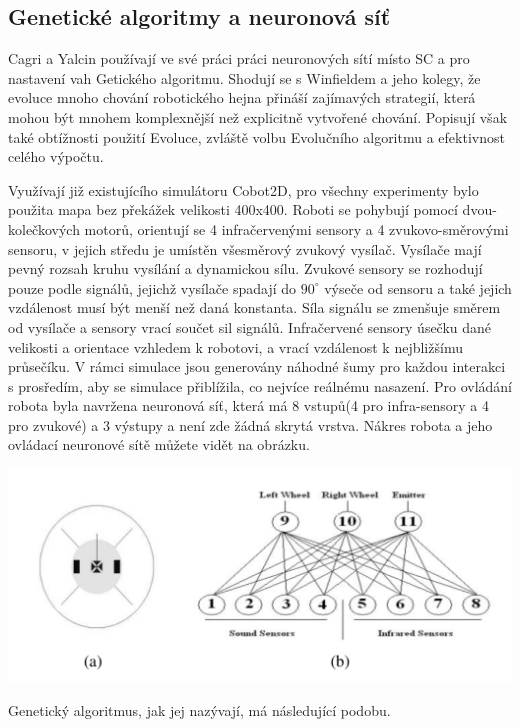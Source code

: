 \subsection{Genetické algoritmy a neuronová síť}
Cagri a Yalcin používají ve své práci \citep{yalcin2008evolving} práci neuronových sítí místo SC a pro nastavení vah Getického algoritmu. Shodují se s Winfieldem a jeho kolegy, že evoluce mnoho chování robotického hejna přináší zajímavých strategií, která mohou být mnohem komplexnější než explicitně vytvořené chování. Popisují však také obtížnosti použití Evoluce, zvláště volbu Evolučního algoritmu a efektivnost celého výpočtu. 
\par
Využívají již existujícího simulátoru Cobot2D, pro všechny experimenty bylo použita mapa bez překážek velikosti 400x400. Roboti se pohybují pomocí dvou-kolečkových motorů, orientují se 4 infračervenými sensory a 4 zvukovo-směrovými sensoru, v jejich středu je umístěn všesměrový zvukový vysílač. Vysílače mají pevný rozsah kruhu vysílání a dynamickou sílu. Zvukové sensory se rozhodují pouze podle signálů, jejichž vysílače spadají do $90^\circ$ výseče od sensoru a také jejich vzdálenost musí být menší než daná konstanta. Síla signálu se zmenšuje směrem od vysílače a sensory vrací součet sil signálů. Infračervené sensory úsečku dané velikosti a orientace vzhledem k robotovi, a vrací vzdálenost k nejbližšímu průsečíku. V rámci simulace jsou generovány náhodné šumy pro každou interakci s prosředím, aby se simulace přiblížila, co nejvíce reálnému nasazení. Pro ovládání robota byla navržena neuronová síť, která má 8 vstupů(4 pro infra-sensory a 4 pro zvukové) a 3 výstupy a není zde žádná skrytá vrstva. Nákres robota a jeho ovládací neuronové sítě můžete vidět na obrázku. \par
\begin{center} 
\includegraphics[scale=0.5]{../img/Cobot.png}
\end{center}
\par
Genetický algoritmus, jak jej nazývají, má následující podobu.\par 

